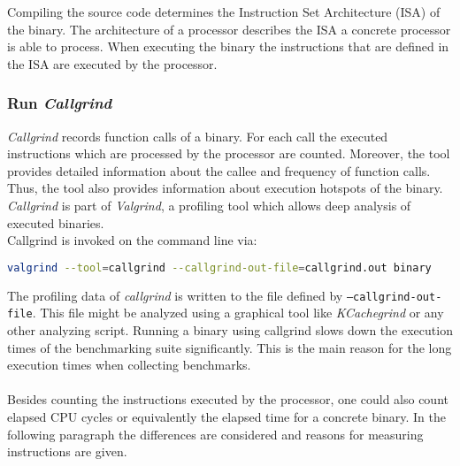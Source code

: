 Compiling the source code determines the Instruction Set Architecture (\gls{ISA}) of the binary. The architecture of a processor describes the \gls{ISA} a concrete processor is able to  process. When executing the binary the instructions that are defined in the \gls{ISA} are executed by the processor.

\subsubsection{Run \textit{Callgrind}}
\textit{Callgrind} records function calls of a binary. For each call the executed instructions which are processed by the processor are counted. Moreover, the tool provides detailed information about the callee and frequency of function calls. Thus, the tool also provides information about execution hotspots of the binary. \textit{Callgrind} is part of \textit{Valgrind}, a profiling tool which allows deep analysis of executed binaries.\\
Callgrind is invoked on the command line via:
\begin{lstlisting}[language=Bash]
valgrind --tool=callgrind --callgrind-out-file=callgrind.out binary
\end{lstlisting}
The profiling data of \textit{callgrind} is written to the file defined by \texttt{--callgrind-out-file}. This file might be analyzed using a graphical tool like \textit{KCachegrind} or any other analyzing script.
Running a binary using callgrind slows down the execution times of the benchmarking suite significantly. This is the main reason for the long execution times when collecting benchmarks. \\\\
Besides counting the instructions executed by the processor, one could also count elapsed \gls{CPU} cycles or equivalently the elapsed time for a concrete binary. In the following paragraph the differences are considered and reasons for measuring instructions are given.
\\

